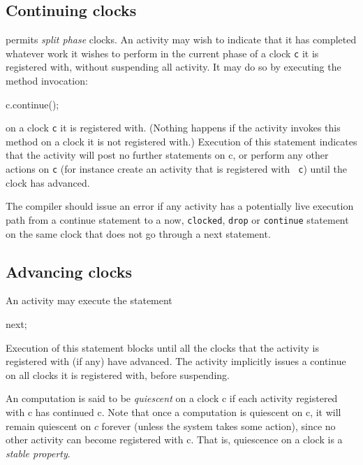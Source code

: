 

\subsection{Continuing clocks}
\Xten{} permits {\em split phase} clocks. An activity may wish
to indicate that it has completed whatever work it wishes to perform
in the current phase of a  clock {\tt c} it is registered with, without
suspending all activity. It may do so  by executing the method
invocation:
\begin{x10}
  c.continue();
\end{x10}
\noindent on a clock {\tt c} it is registered with.  (Nothing happens
if the activity invokes this method on a clock it is not registered
with.) Execution of this statement indicates that the activity will
post no further statements on {\cf c}, or perform any other actions on
{\tt c} (for instance create an activity that is registered with {\tt
c}) until the clock has advanced.

The compiler should issue an error if any activity has a potentially
live execution path from a {\cf continue} statement to a {\cf now},
{\tt clocked}, {\tt drop} or {\tt continue} statement on the same
clock that does not go through a {\cf next} statement.

\subsection{Advancing clocks}
An activity may execute the statement
\begin{x10}
  next;
\end{x10}

\noindent 
Execution of this statement blocks until all the clocks that the
activity is registered with (if any) have advanced. The activity
implicitly issues a {\cf continue} on all clocks it is registered
with, before suspending.

An \Xten{} computation is said to be {\em quiescent} on a clock {\cf
c} if each activity registered with {\cf c} has continued {\cf c}.
Note that once a computation is quiescent on {\cf c}, it will remain
quiescent on $c$ forever (unless the system takes some action), since
no other activity can become registered with {\cf c}.  That is,
quiescence on a clock is a {\em stable property}.

